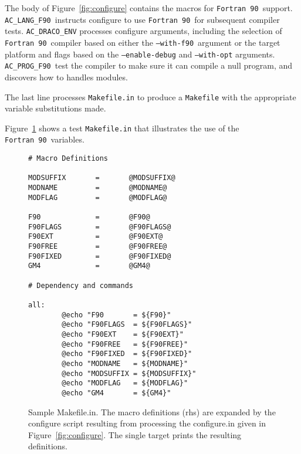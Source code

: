 \documentclass[11pt]{nmemo}
\newcommand{\fninety}{\texttt{Fortran~90}}
\newcommand{\withfninety}{\texttt{--with-f90}}
\newcommand{\langfninety}{\texttt{AC\_LANG\_F90}}
\newcommand{\progfninety}{\texttt{AC\_PROG\_F90}}
\begin{document}
The body of Figure~\ref{fig:configure} contains the macros for
\fninety\ support.  \langfninety\ instructs configure to use \fninety\
for subsequent compiler tests.  \texttt{AC\_DRACO\_ENV} processes
configure arguments, including the selection of \fninety\ compiler
based on either the \withfninety\ argument or the target platform and
flags based on the \texttt{--enable-debug} and \texttt{--with-opt}
arguments.  \progfninety\ test the compiler to make sure it can
compile a null program, and discovers how to handles modules.

The last line processes \texttt{Makefile.in} to produce a
\texttt{Makefile} with the appropriate variable substitutions made.

Figure~\ref{fig:makefile} shows a test \texttt{Makefile.in} that
illustrates the use of the \fninety\ variables.  
\begin{figure}[hbt]
\hrulefill
\begin{verbatim}
# Macro Definitions

MODSUFFIX       =       @MODSUFFIX@
MODNAME         =       @MODNAME@
MODFLAG         =       @MODFLAG@

F90             =       @F90@
F90FLAGS        =       @F90FLAGS@
F90EXT          =       @F90EXT@
F90FREE         =       @F90FREE@
F90FIXED        =       @F90FIXED@
GM4             =       @GM4@

# Dependency and commands

all:
        @echo "F90       = ${F90}"
        @echo "F90FLAGS  = ${F90FLAGS}"
        @echo "F90EXT    = ${F90EXT}"
        @echo "F90FREE   = ${F90FREE}"
        @echo "F90FIXED  = ${F90FIXED}"
        @echo "MODNAME   = ${MODNAME}"
        @echo "MODSUFFIX = ${MODSUFFIX}"
        @echo "MODFLAG   = ${MODFLAG}"
        @echo "GM4       = ${GM4}"
\end{verbatim}%
\caption{Sample Makefile.in.  The macro definitions (rhs) are expanded
by the configure script resulting from processing the configure.in
given in Figure~\ref{fig:configure}.  The single target prints the
resulting definitions.}\label{fig:makefile} \hrulefill
\end{figure}
\end{document}

